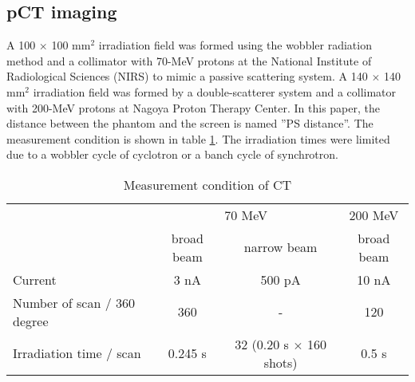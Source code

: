 \documentclass[preprint,3pt]{elsarticle} %
\begin{document}
{\subsection{pCT imaging}
	A 100 $\times$ 100 mm$^{2}$ irradiation field was formed using the wobbler radiation method and a collimator with 70-MeV protons at the National Institute of Radiological Sciences (NIRS) to mimic a passive scattering system. A 140 $\times$ 140 mm$^{2}$ irradiation field was formed by a double-scatterer system and a collimator with 200-MeV protons at Nagoya Proton Therapy Center. In this paper, the distance between the phantom and the screen is named ''PS distance''. The measurement condition is shown in table \ref{condition}. The irradiation times were limited due to a wobbler cycle of cyclotron or a banch cycle of synchrotron.\\
\begin{table}[H]
\centering
\begin{tabular}{p{5cm}ccc} 
\hline
 & \multicolumn{2}{c}{70 MeV} & 200 MeV\\ 
 & broad beam & narrow beam & broad beam\\
\hline
Current & 3 nA & 500 pA & 10 nA \\
Number of scan / 360 degree & 360 & - & 120 \\
Irradiation time / scan & 0.245 s & 32 (0.20 s $\times$ 160 shots) & 0.5 s\\
\hline
\end{tabular}
\caption{Measurement condition of CT}
\label{condition}
\end{table}

}
\end{document}
